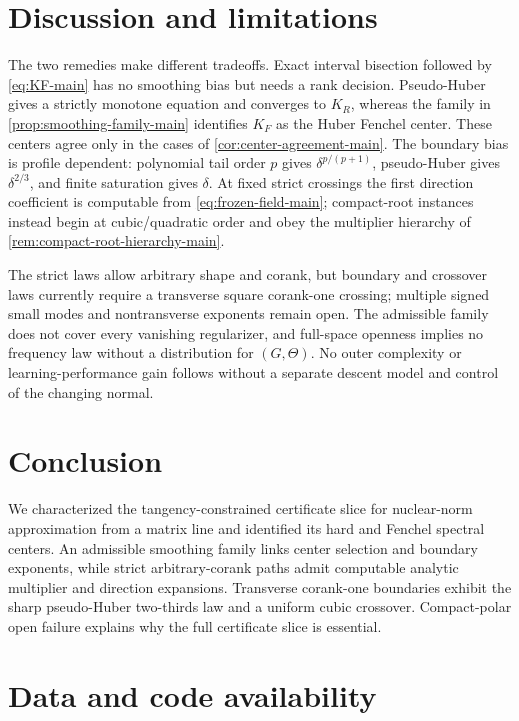 \section{Discussion and limitations}
\label{sec:discussion}

The two remedies make different tradeoffs.  Exact interval bisection followed
by \eqref{eq:KF-main} has no smoothing bias but needs a rank decision.
Pseudo-Huber gives a strictly monotone equation and converges to \(K_R\),
whereas the family in \cref{prop:smoothing-family-main} identifies \(K_F\) as
the Huber Fenchel center.  These centers agree only in the cases of
\cref{cor:center-agreement-main}.  The boundary bias is profile dependent:
polynomial tail order \(p\) gives \(\delta^{p/(p+1)}\), pseudo-Huber gives
\(\delta^{2/3}\), and finite saturation gives \(\delta\).  At fixed strict
crossings the first direction coefficient is computable from
\eqref{eq:frozen-field-main}; compact-root instances instead begin at
cubic/quadratic order and obey the multiplier hierarchy of
\cref{rem:compact-root-hierarchy-main}.

The strict laws allow arbitrary shape and corank, but boundary and crossover
laws currently require a transverse square corank-one crossing; multiple
signed small modes and nontransverse exponents remain open.  The admissible
family does not cover every vanishing regularizer, and full-space openness
implies no frequency law without a distribution for \((G,\Theta)\).  No outer
complexity or learning-performance gain follows without a separate descent
model and control of the changing normal.

\section{Conclusion}

We characterized the tangency-constrained certificate slice for nuclear-norm
approximation from a matrix line and identified its hard and Fenchel spectral
centers.  An admissible smoothing family links center selection and boundary
exponents, while strict arbitrary-corank paths admit computable analytic
multiplier and direction expansions.  Transverse corank-one boundaries
exhibit the sharp pseudo-Huber two-thirds law and a uniform cubic crossover.
Compact-polar open failure explains why the full certificate slice is
essential.

\section*{Data and code availability}

